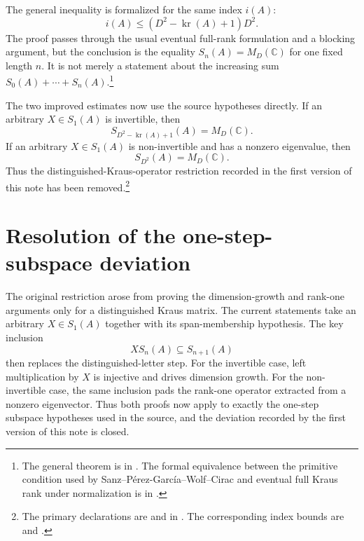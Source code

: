 \documentclass{article}
\begin{document}
The general inequality is formalized for the same index $i(A)$:
\[
    i(A)\leq (D^2-\operatorname{kr}(A)+1)D^2.
\]
The proof passes through the usual eventual full-rank formulation and a
blocking argument, but the conclusion is the equality
$S_n(A)=M_D(\mathbb C)$ for one fixed length $n$. It is not merely a statement
about the increasing sum $S_0(A)+\cdots+S_n(A)$.\footnote{The general
    theorem is 
    in . The formal equivalence
    between the primitive condition used by Sanz--P\'erez-Garc\'ia--Wolf--Cirac
    and eventual full Kraus rank under normalization is in
    .}

The two improved estimates now use the source hypotheses directly. If an
arbitrary $X\in S_1(A)$ is invertible, then
\[
    S_{D^2-\operatorname{kr}(A)+1}(A)=M_D(\mathbb C).
\]
If an arbitrary $X\in S_1(A)$ is non-invertible and has a nonzero eigenvalue,
then
\[
    S_{D^2}(A)=M_D(\mathbb C).
\]
Thus the distinguished-Kraus-operator restriction recorded in the first
version of this note has been removed.\footnote{The primary declarations are
    and
    in . The corresponding index
    bounds are  and
    .}

\section{Resolution of the one-step-subspace deviation}

The original restriction arose from proving the dimension-growth and rank-one
arguments only for a distinguished Kraus matrix. The current statements take an
arbitrary $X\in S_1(A)$ together with its span-membership hypothesis. The key
inclusion
\[
    XS_n(A)\subseteq S_{n+1}(A)
\]
then replaces the distinguished-letter step. For the invertible case, left
multiplication by $X$ is injective and drives dimension growth. For the
non-invertible case, the same inclusion pads the rank-one operator extracted
from a nonzero eigenvector. Thus both proofs now apply to exactly the one-step
subspace hypotheses used in the source, and the deviation recorded by the first
version of this note is closed.
\end{document}
